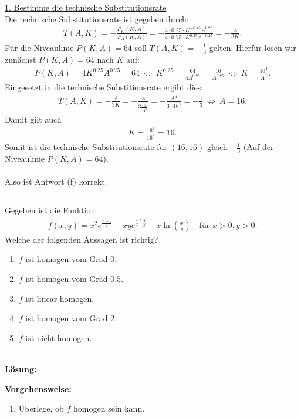 \underline{1. Bestimme die technische Substitutionsrate}\\
Die technische Substitutionsrate ist gegeben durch:
\begin{align*}
	T(A,K) = - \frac{P_K(K,A)}{P_A(K,A)}
	 = -\frac{4 \cdot 0.25 \cdot K^{-0.75} A^{0.75}}{4 \cdot 0.75 \cdot  K^{0.25} A^{-0.25}} 
	 =
	 -\frac{A}{3 K }. 
\end{align*}
Für die Niveaulinie $ P(K,A) = 64  $ soll $ T(A,K) = -\frac{1}{3} $ gelten. Hierfür lösen wir zunächst $ P(K,A) = 64  $ nach $ K $ auf:
\begin{align*}
	P(K,A )= 4 K^{0.25} A^{0.75} = 64 
	\ \Leftrightarrow \
	K^{0.25} = \frac{64}{4 A^{0.75}}
	= \frac{16}{A^{0.75}}
	\ \Leftrightarrow \
	K = \frac{16^4}{A^3}. 
\end{align*}
Eingesetzt in die technische Substitionsrate ergibt dies:
\begin{align*}
	T(A,K)
	=
	-\frac{A}{3 K }
	=
	- \frac{A}{3 \frac{16^4}{A^3}}
	=
	- \frac{A^4}{3 \cdot 16^4}
	=
	- \frac{1}{3}
	\ \Leftrightarrow \
	A = 16.
\end{align*}
Damit gilt auch 
\begin{align*}
	K = \frac{16^4}{16^3} = 16.
\end{align*}
Somit ist die technische Substitutionsrate für $ (16,16) $ gleich $ - \frac{1}{3} $ (Auf der Niveaulinie $ P(K,A ) = 64 $).\\
\\
Also ist Antwort (f) korrekt.




\newpage



\subsection*{}
Gegeben ist die Funktion
\begin{align*}
	f(x,y) 
	=
	x^2 e^{\frac{x+y}{x}}
	-
	xy e^{\frac{x+y}{x-y}}
	+
	x \ln \left( \frac{x}{y} \right)
	\quad \textrm{für } x>0,y>0.
\end{align*}
Welche der folgenden Aussagen ist richtig?
\renewcommand{\labelenumi}{(\alph{enumi})}
\begin{enumerate}
	\item
	$ f  $ ist homogen vom Grad $ 0 $.
	\item
	$ f  $ ist homogen vom Grad $ 0.5 $.
	\item
	$ f $ ist linear homogen.	
	\item 
	$ f  $ ist homogen vom Grad $ 2 $.
	\item
	$ f $ ist nicht homogen.
\end{enumerate}
\ \\
\textbf{Lösung:}
\begin{mdframed}
\underline{\textbf{Vorgehensweise:}}
\renewcommand{\labelenumi}{\theenumi.}
\begin{enumerate}
\item Überlege, ob $ f $ homogen sein kann.
\end{enumerate}
\end{mdframed}

